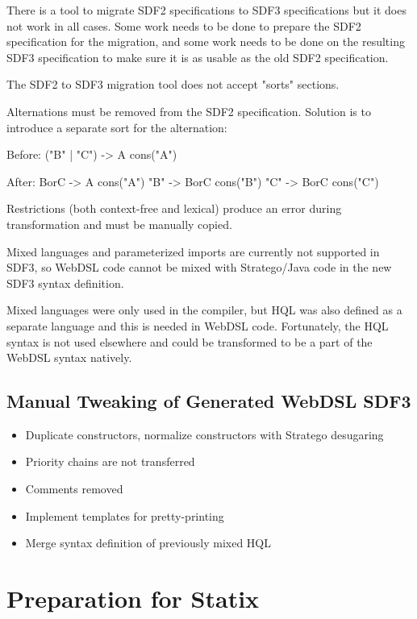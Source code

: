      There is a tool to migrate SDF2 specifications to SDF3 specifications but it does not work in all cases. Some work needs to be done to prepare the SDF2 specification for the migration, and some work needs to be done on the resulting SDF3 specification to make sure it is as usable as the old SDF2 specification.

      The SDF2 to SDF3 migration tool does not accept "sorts" sections.

      Alternations must be removed from the SDF2 specification. Solution is to introduce a separate sort for the alternation:

      Before:
      ("B" | "C") -> A {cons("A")}

      After:
      BorC -> A    {cons("A")}
      "B"  -> BorC {cons("B")}
      "C"  -> BorC {cons("C")}

      Restrictions (both context-free and lexical) produce an error during transformation and must be manually copied.

      Mixed languages and parameterized imports are currently not supported in SDF3, so WebDSL code cannot be mixed with Stratego/Java code in the new SDF3 syntax definition.

      Mixed languages were only used in the compiler, but HQL was also defined as a separate language and this is needed in WebDSL code. Fortunately, the HQL syntax is not used elsewhere and could be transformed to be a part of the WebDSL syntax natively.

    \subsection{Manual Tweaking of Generated WebDSL SDF3}

      \begin{itemize}
        \item Duplicate constructors, normalize constructors with Stratego desugaring
        \item Priority chains are not transferred
        \item Comments removed
        \item Implement templates for pretty-printing
        \item Merge syntax definition of previously mixed HQL
      \end{itemize}

  \section{Preparation for Statix}

